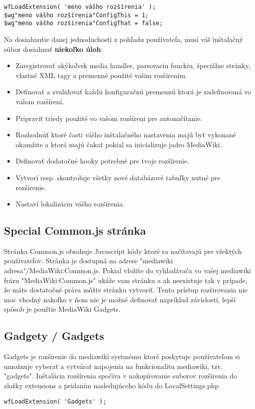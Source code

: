 \begin{verbatim}
wfLoadExtension( 'meno vášho rozšírenia' ); 
$wg"meno vášho rozšírenia"ConfigThis = 1; 
$wg"meno vášho rozšírenia"ConfigThat = false;
\end{verbatim}
Na dosiahnutie danej jednoduchosti z pohľadu používateľa, musí váš inštalačný súbor dosiahnuť \textbf{niekoľko úloh}:
\begin{itemize}

\item Zaregistrovať akýkoľvek media handler, parsovaciu funckiu, špeciálne stránky, vlastné XML tagy a premenné použité vašim rozšírením.

\item Definovať a zvalidovať každú konfiguračnú premennú ktorá je zadefinovaná vo vašom rozšírení.

\item Pripraviť triedy použité vo vašom rozšíreni pre autonačítanie.

\item Rozhodnúť ktoré časti vášho inštalačného nastavenia majú byť vykonané okamžite a ktorá majú čakať pokial sa inicializuje jadro MediaWiki.

\item Definovať dodatočné hooky potrebné pre tvoje rozšírenie.

\item Vytvorí resp. skontroluje všetky nové databázové tabuľky nutné pre rozšírenie.

\item Nastaví lokalizáciu vášho rozšírenia.
\end{itemize}

\subsection{Special Common.js stránka}

Stránka Common.js obsahuje Javascript kódy ktoré sa načítavajú pre všektých používateľov.
Stránka je dostupná na adrese "mediawiki adresa"/MediaWiki:Common.js. Pokial vložíte do vyhladávača vo vašej mediawiki frázu "MediaWiki:Common.js" ukáže vam stránku a ak neexistuje tak v prípade, že máte dostatočné práva môžte stránku vytvoriť.
Tento prístup rozširovania nie moc vhodný nakoľko v ňom nie je možné definovať napríklad závislostí, lepší spôsob je použtie MediaWiki Gadgets.

\subsection{Gadgety / Gadgets}
Gadgets je rozšírenie do mediawiki systmému ktoré poskytuje používateľom si umožnuje vyberať a vytvárať napojenia na funkcionalitu mediawiki, tzv. "gadgets".
Inštalácia rozšírenia spočíva v nakopírovanie suborov rozšírenia do zložky extensions a pridaním nasledujúceho kódu do LocalSettings.php
\begin{verbatim}
wfLoadExtension( 'Gadgets' );
\end{verbatim}
